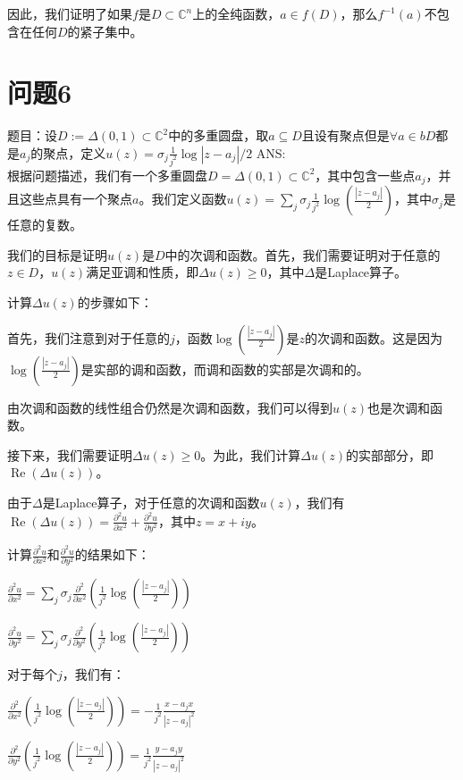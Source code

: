 \documentclass[12pt, a4paper, oneside]{ctexart}
\begin{document}
\begin{spacing}{2.0}
因此，我们证明了如果$f$是$\displaystyle D\subset \mathbb{C}^n$上的全纯函数，$a\in f(D)$，那么$f^{-1}(a)$不包含在任何$D$的紧子集中。
\section{问题6}
题目：设$\displaystyle D := \Delta(0, 1) \subset \mathbb{C} ^2$中的多重圆盘，取${a}\subseteq D$且设有聚点但是$\forall a\in bD$都是${a_j}$的聚点，定义$\displaystyle u(z) = \sigma_j \frac{1}{j^2}\log{|z-a_j|/2}$
ANS:\\
根据问题描述，我们有一个多重圆盘$\displaystyle D = \Delta(0, 1) \subset \mathbb{C}^2$，其中包含一些点$a_j$，并且这些点具有一个聚点$a$。我们定义函数$\displaystyle u(z) = \sum_{j}\sigma_j \frac{1}{j^2}\log\left(\frac{|z-a_j|}{2}\right)$，其中$\sigma_j$是任意的复数。

我们的目标是证明$u(z)$是$D$中的次调和函数。首先，我们需要证明对于任意的$z\in D$，$u(z)$满足亚调和性质，即$\Delta u(z) \geq 0$，其中$\Delta$是Laplace算子。

计算$\Delta u(z)$的步骤如下：

首先，我们注意到对于任意的$j$，函数$\displaystyle \log\left(\frac{|z-a_j|}{2}\right)$是$z$的次调和函数。这是因为$\displaystyle \log\left(\frac{|z-a_j|}{2}\right)$是实部的调和函数，而调和函数的实部是次调和的。

由次调和函数的线性组合仍然是次调和函数，我们可以得到$u(z)$也是次调和函数。

接下来，我们需要证明$\Delta u(z) \geq 0$。为此，我们计算$\Delta u(z)$的实部部分，即$\displaystyle \operatorname{Re}(\Delta u(z))$。

由于$\Delta$是Laplace算子，对于任意的次调和函数$u(z)$，我们有$\displaystyle \operatorname{Re}(\Delta u(z)) = \frac{\partial^2 u}{\partial x^2} + \frac{\partial^2 u}{\partial y^2}$，其中$z = x+iy$。

计算$\displaystyle \frac{\partial^2 u}{\partial x^2}$和$\displaystyle \frac{\partial^2 u}{\partial y^2}$的结果如下：
\begin{center}
    $\displaystyle \frac{\partial^2u}{\partial x^2}=\sum_j\sigma_j\frac{\partial^2}{\partial x^2}\left(\frac{1}{j^2}\log\left(\frac{|z-a_j|}{2}\right)\right)$
\end{center}

\begin{center}
    $\displaystyle \frac{\partial^2u}{\partial y^2}=\sum_j\sigma_j\frac{\partial^2}{\partial y^2}\left(\frac{1}{j^2}\log\left(\frac{|z-a_j|}{2}\right)\right)$
\end{center}
对于每个$j$，我们有：
\begin{center}
    $\displaystyle \frac{\partial^2}{\partial x^2}\left(\frac{1}{j^2}\log\left(\frac{|z-a_j|}{2}\right)\right)=-\frac{1}{j^2}\frac{x-a_jx}{|z-a_j|^2}$
\end{center}
\begin{center}
    $\displaystyle \frac{\partial^2}{\partial y^2}\left(\frac{1}{j^2}\log\left(\frac{|z-a_j|}{2}\right)\right)=\frac{1}{j^2}\frac{y-a_j y}{|z-a_j|^2}$


\end{center}
\end{spacing}
\end{document}
